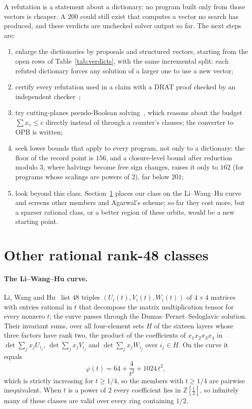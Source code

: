 \documentclass[11pt]{article}
\theoremstyle{remark}
\newcommand{\Z}{\mathbb{Z}}
\newcommand{\Zh}{\Z[\tfrac12]}
\begin{document}
A refutation is a statement about a dictionary: no program built only
from those vectors is cheaper.  A $200$ could still exist that computes a
vector no search has produced, and these verdicts are unchecked solver
output so far.  The next steps are:
\begin{enumerate}
\item enlarge the dictionaries by proposals and structured vectors,
  starting from the open rows of Table~\ref{tab:verdicts}, with the same
  incremental split: each refuted dictionary forces any solution of a
  larger one to use a new vector;
\item certify every refutation used in a claim with a DRAT proof checked
  by an independent checker~\cite{DRATtrim};
\item try cutting-planes pseudo-Boolean solving~\cite{RoundingSat}, which
  reasons about the budget $\sum x_v\le c$ directly instead of through a
  counter's clauses; the converter to OPB is written;
\item seek lower bounds that apply to every program, not only to a
  dictionary: the floor of the record point is $156$, and a closure-level
  bound after reduction modulo $3$, where halvings become free sign
  changes, raises it only to $162$ (for programs whose scalings are
  powers of $2$), far below $201$;
\item look beyond this class.  Section~\ref{sec:classes} places our
  class on the Li--Wang--Hu curve and screens other members and
  Agarwal's scheme; so far they cost more, but a sparser rational class,
  or a better region of these orbits, would be a new starting point.
\end{enumerate}

\section{Other rational rank-48 classes}\label{sec:classes}

\paragraph{The Li--Wang--Hu curve.}  Li, Wang and Hu~\cite{LWH26} list
$48$ triples $(U_i(t),V_i(t),W_i(t))$ of $4\times4$ matrices with entries
rational in $t$ that decompose the matrix multiplication tensor for every
nonzero $t$; the curve passes through the Dumas--Pernet--Sedoglavic
solution.  Their invariant sums, over all four-element sets $H$ of the
sixteen layers whose three factors have rank two, the product of the
coefficients of $x_1x_2x_3x_4$ in $\det\sum_j x_jU_{i_j}$,
$\det\sum_j x_jV_{i_j}$ and $\det\sum_j x_jW_{i_j}$ over $i_j\in H$.  On
the curve it equals
\[
\varphi(t)=64+\frac4{t^2}+1024\,t^2,
\]
which is strictly increasing for $t\ge1/4$, so the members with
$t\ge1/4$ are pairwise inequivalent.  When $t$ is a power of $2$ every
coefficient lies in $\Zh$, so infinitely many of these classes are valid
over every ring containing $1/2$.
\end{document}
